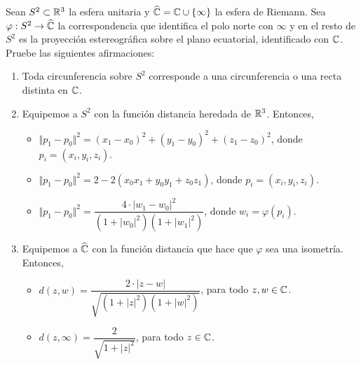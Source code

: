 \begin{exercise}
Sean $S^2 \subset \mathbb R^3$ la esfera unitaria y $\widehat {\mathbb C} = \mathbb C \cup \{ \infty \}$ la esfera de Riemann. Sea $\varphi : S^2 \to \widehat {\mathbb C}$ la correspondencia que identifica el polo norte con $\infty$ y en el resto de $S^2$ es la proyección estereográfica sobre el plano ecuatorial, identificado con $\mathbb C$. Pruebe las siguientes afirmaciones:
\begin{enumerate}[label=(\alph*)]
    \item Toda circunferencia sobre $S^2$ corresponde a una circunferencia o una recta distinta en $\mathbb C$.
    
    \item Equipemos a $S^2$ con la función distancia heredada de $\mathbb R^3$. Entonces,
    \begin{itemize}
        \item $\Vert p_1 - p_0 \Vert^2 = (x_1 - x_0)^2 + (y_1 - y_0)^2 + (z_1 - z_0)^2$, donde $p_i = (x_i, y_i, z_i)$.
        \item $\Vert p_1 - p_0 \Vert^2 = 2 - 2 (x_0 x_1 + y_0 y_1 + z_0 z_1)$, donde $p_i = (x_i, y_i, z_i)$.
        \item $\Vert p_1 - p_0 \Vert^2 = \dfrac {4 \cdot |w_1 - w_0|^2} {(1 + |w_0|^2) (1 + |w_1|^2)}$, donde $w_i = \varphi(p_i)$.
    \end{itemize}
    
    \item Equipemos a $\widehat {\mathbb C}$ con la función distancia que hace que $\varphi$ sea una isometría. Entonces,
    \begin{itemize}
        \item $d(z, w) = \dfrac {2 \cdot |z - w|} {\sqrt {(1 + |z|^2) (1 + |w|^2)}}$, para todo $z, w \in \mathbb C$.
        \item $d(z, \infty) = \dfrac 2 {\sqrt {1 + |z|^2}}$, para todo $z \in \mathbb C$.
    \end{itemize}
\end{enumerate}
\end{exercise}


